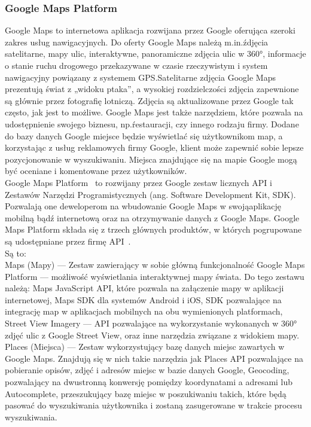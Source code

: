         \subsubsection{Google Maps Platform}
        Google Maps to internetowa aplikacja rozwijana przez Google oferująca szeroki zakres usług nawigacyjnych. Do oferty Google Maps należą m.in.\' zdjęcia satelitarne, mapy ulic, interaktywne,
        panoramiczne zdjęcia ulic w 360°, informacje o stanie ruchu drogowego przekazywane w czasie rzeczywistym i system nawigacyjny powiązany z systemem GPS.\@ Satelitarne zdjęcia Google Maps
        prezentują świat z „widoku ptaka”, a wysokiej rozdzielczości zdjęcia zapewnione są głównie przez fotografię lotniczą. Zdjęcia są aktualizowane przez Google tak często, jak jest to możliwe.
        Google Maps jest także narzędziem, które pozwala na udostępnienie swojego biznesu, np.\' restauracji, czy innego rodzaju firmy. Dodane do bazy danych Google miejsce będzie
        wyświetlać się użytkownikom map, a korzystając z usług reklamowych firmy Google, klient może zapewnić sobie lepsze pozycjonowanie w wyszukiwaniu. Miejsca znajdujące się na mapie Google
        mogą być oceniane i komentowane przez użytkowników. \\

        Google Maps Platform~\cite{MAPS} to rozwijany przez Google zestaw licznych API i Zestawów Narzędzi Programistycznych (ang. Software Development Kit, SDK). Pozwalają one deweloperom na 
        wbudowanie Google Maps w swoją\@ aplikację mobilną bądź internetową oraz na otrzymywanie danych z Google Maps. Google Maps Platform składa się z trzech głównych produktów, w których pogrupowane
        są udostępniane przez firmę API~\cite{MAPS_API}.\\
        Są to: \\
        
        \noindent Maps (Mapy) — Zestaw zawierający w sobie główną funkcjonalność Google Maps Platform — możliwość wyświetlania interaktywnej mapy świata. Do tego zestawu należą: Maps JavaScript API,
        które pozwala na załączenie mapy w aplikacji internetowej, Maps SDK dla systemów Android i iOS, SDK pozwalające na integrację map w aplikacjach mobilnych na obu wymienionych platformach,
        Street View Imagery — API pozwalające na wykorzystanie wykonanych w 360° zdjęć ulic z Google Street View, oraz inne narzędzia związane z widokiem mapy. \\
        
        \noindent Places (Miejsca) — Zestaw wykorzystujący bazę danych miejsc zawartych w Google Maps. Znajdują się w nich takie narzędzia jak Places API pozwalające na pobieranie
        opisów, zdjęć i adresów miejsc w bazie danych Google, Geocoding, pozwalający na dwustronną konwersję pomiędzy koordynatami a adresami lub Autocomplete, przeszukujący bazę miejsc w poszukiwaniu
        takich, które będą pasować do wyszukiwania użytkownika i zostaną zasugerowane w trakcie procesu wyszukiwania. \\


